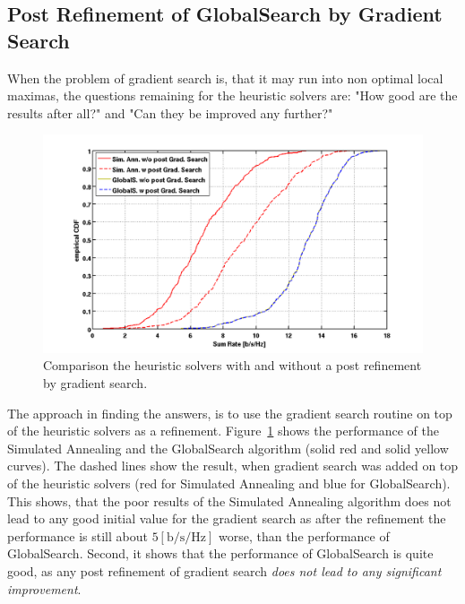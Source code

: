 \subsection{Post Refinement of GlobalSearch by Gradient Search}
\label{sec:postrefinement}
When the problem of gradient search is, that it may run into non optimal local maximas, the questions remaining for the heuristic solvers are: "How good are the results after all?" and "Can they be improved any further?"

\begin{figure}[h]
\centering
  \includegraphics[width=0.9\linewidth]{images/Postrefinementcomparison.png}
\caption{Comparison the heuristic solvers with and without a post refinement by gradient search.}
\label{fig:postrefinement}
\end{figure}

The approach in finding the answers, is to use the gradient search routine on top of the heuristic solvers as a refinement.
Figure~\ref{fig:postrefinement} shows the performance of the Simulated Annealing and the GlobalSearch algorithm (solid red and solid yellow curves).
The dashed lines show the result, when gradient search was added on top of the heuristic solvers (red for Simulated Annealing and blue for GlobalSearch).
This shows, that the poor results of the Simulated Annealing algorithm does not lead to any good initial value for the gradient search as after the refinement the performance is still about $5 \left[\text{b/s/Hz}\right]$ worse, than the performance of GlobalSearch.
Second, it shows that the performance of GlobalSearch is quite good, as any post refinement of gradient search \emph{does not lead to any significant improvement}.



